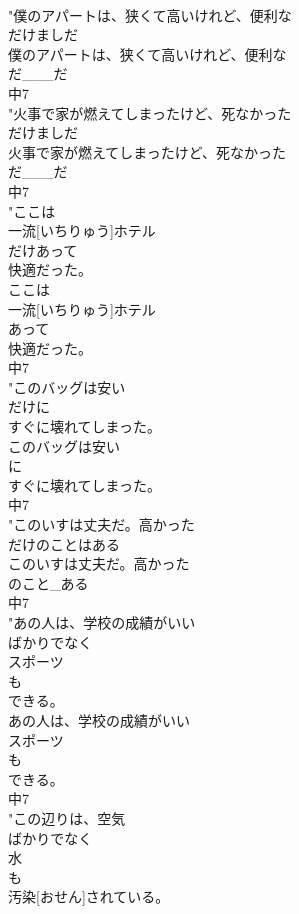 \documentclass[8pt]{extreport}
\begin{document}
\begin{CJK}{UTF8}{min}
\\	"僕のアパートは、狭くて高いけれど、便利な
\\	だけましだ
\\	僕のアパートは、狭くて高いけれど、便利な
\\	だ___だ
\\	中7
\\	"火事で家が燃えてしまったけど、死なかった
\\	だけましだ
\\	火事で家が燃えてしまったけど、死なかった
\\	だ___だ
\\	中7
\\	"ここは
\\	一流[いちりゅう]ホテル
\\	だけあって
\\	快適だった。
\\	ここは
\\	一流[いちりゅう]ホテル
\\	あって
\\	快適だった。
\\	中7
\\	"このバッグは安い
\\	だけに
\\	すぐに壊れてしまった。
\\	このバッグは安い
\\	に
\\	すぐに壊れてしまった。
\\	中7
\\	"このいすは丈夫だ。高かった
\\	だけのことはある
\\	このいすは丈夫だ。高かった
\\	のこと_ある
\\	中7
\\	"あの人は、学校の成績がいい
\\	ばかりでなく
\\	スポーツ
\\	も
\\	できる。
\\	あの人は、学校の成績がいい
\\	スポーツ
\\	も
\\	できる。
\\	中7
\\	"この辺りは、空気
\\	ばかりでなく
\\	水
\\	も
\\	汚染[おせん]されている。

\end{CJK}
\end{document}
